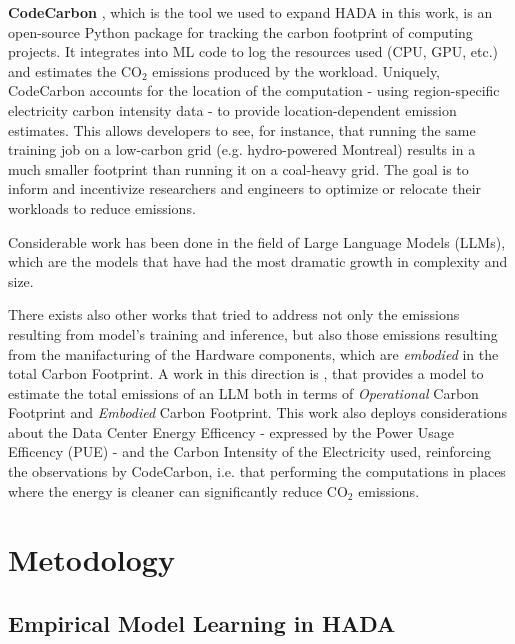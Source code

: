\documentclass[a4paper,singleside,12pt]{report} %
\begin{document}
\textbf{CodeCarbon} \cite{courty2024codecarbon}, which is the tool we used to expand HADA in this work, 
is an open-source Python package for tracking the carbon footprint  of computing projects. It 
integrates into ML code to log the resources used (CPU, GPU, etc.) and estimates the $\mathrm{CO_2}$ emissions
produced by the workload. Uniquely, CodeCarbon accounts for the location of the computation - using 
region-specific electricity carbon intensity data - to provide location-dependent emission estimates. 
This allows developers to see, for instance, that running the same training job on a low-carbon grid 
(e.g. hydro-powered Montreal) results in a much smaller footprint than running it on a coal-heavy grid. 
The goal is to inform and incentivize researchers and engineers to optimize or relocate their workloads to 
reduce emissions.

Considerable work has been done in the field of Large Language Models (LLMs), which are the models that have had the most 
dramatic growth in complexity and size.

There exists also other works that tried to address not only the emissions resulting from model's training and inference,
but also those emissions resulting from the manifacturing of the Hardware components, which are \textit{embodied} in the 
total Carbon Footprint. A work in this direction is \cite{faiz2024llmcarbon}, that provides a model to estimate the total
emissions of an LLM both in terms of \textit{Operational} Carbon Footprint and \textit{Embodied} Carbon Footprint. This work
also deploys considerations about the Data Center Energy Efficency - expressed by the Power Usage Efficency (PUE) - and the 
Carbon Intensity of the Electricity used, reinforcing the observations by CodeCarbon, i.e. that performing the computations
in places where the energy is cleaner can significantly reduce $\mathrm{CO_2}$ emissions.
 
\chapter{Metodology}

\section{Empirical Model Learning in HADA} \label{EML-HADA}
\end{document}
